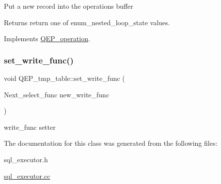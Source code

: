 Put a new record into the operation\textquotesingle{}s buffer \begin{DoxyReturn}{Returns}
return one of enum\+\_\+nested\+\_\+loop\+\_\+state values. 
\end{DoxyReturn}


Implements \mbox{\hyperlink{classQEP__operation_af7cac289b2b1a38349cc27e8a4ff7597}{Q\+E\+P\+\_\+operation}}.

\mbox{\label{classQEP__tmp__table_a4b658910c518a85ddf9c3640463dac18}} 
\subsubsection{\texorpdfstring{set\+\_\+write\+\_\+func()}{set\_write\_func()}}
{\footnotesize\ttfamily void Q\+E\+P\+\_\+tmp\+\_\+table\+::set\+\_\+write\+\_\+func (\begin{DoxyParamCaption}\item[{Next\+\_\+select\+\_\+func}]{new\+\_\+write\+\_\+func }\end{DoxyParamCaption})\hspace{0.3cm}{\ttfamily [inline]}}

write\+\_\+func setter 

The documentation for this class was generated from the following files\+:\begin{DoxyCompactItemize}
\item 
sql\+\_\+executor.\+h\item 
\mbox{\hyperlink{sql__executor_8cc}{sql\+\_\+executor.\+cc}}\end{DoxyCompactItemize}
